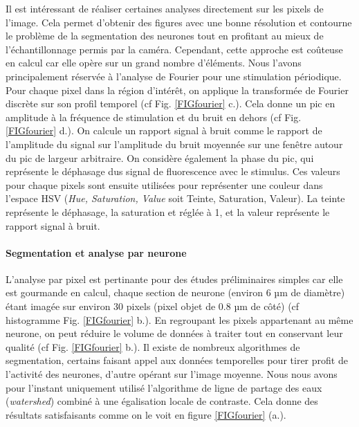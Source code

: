 Il est intéressant de réaliser certaines analyses directement sur les pixels de l'image. Cela permet d'obtenir des figures avec une bonne résolution et contourne le problème de la segmentation des neurones tout en profitant au mieux de l'échantillonnage permis par la caméra. Cependant, cette approche est coûteuse en calcul car elle opère sur un grand nombre d'éléments. Nous l'avons principalement réservée à l'analyse de Fourier pour une stimulation périodique.
Pour chaque pixel dans la région d'intérêt, on applique la transformée de Fourier discrète sur son profil temporel (cf Fig. \ref{FIGfourier} c.). Cela donne un pic en amplitude à la fréquence de stimulation et du bruit en dehors (cf Fig. \ref{FIGfourier} d.). On calcule un rapport signal à bruit comme le rapport de l'amplitude du signal sur l'amplitude du bruit moyennée sur une fenêtre autour du pic de largeur arbitraire. On considère également la phase du pic, qui représente le déphasage dus signal de fluorescence avec le stimulus.
Ces valeurs pour chaque pixels sont ensuite utilisées pour représenter une couleur dans l'espace HSV (\emph{Hue, Saturation, Value} soit Teinte, Saturation, Valeur). La teinte représente le déphasage, la saturation et réglée à 1, et la valeur représente le rapport signal à bruit. 

\paragraph{Segmentation et analyse par neurone}

L'analyse par pixel est pertinante pour des études préliminaires simples car elle est gourmande en calcul, chaque section de neurone (environ 6 µm de diamètre) étant imagée sur environ 30 pixels (pixel objet de 0.8 µm de côté) (cf histogramme Fig. \ref{FIGfourier} b.). En regroupant les pixels appartenant au même neurone, on peut réduire le volume de données à traiter tout en conservant leur qualité (cf Fig. \ref{FIGfourier} b.). Il existe de nombreux algorithmes de segmentation, certains faisant appel aux données temporelles pour tirer profit de l'activité des neurones, d'autre opérant sur l'image moyenne. Nous nous avons pour l'instant uniquement utilisé l'algorithme de ligne de partage des eaux (\emph{watershed}) combiné à une égalisation locale de contraste. Cela donne des résultats satisfaisants comme on le voit en figure \ref{FIGfourier} (a.).


